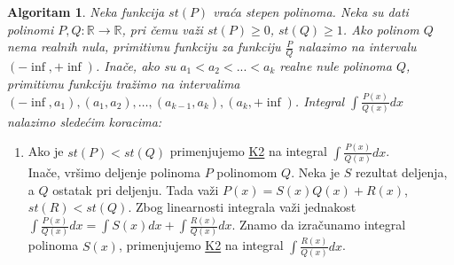 \documentclass{article}
\newtheorem{alg}{Algoritam}[section]
\begin{document}
\begin{algbox}
    \begin{alg}
        Neka funkcija $st(P)$ vraća stepen polinoma.
        Neka su dati polinomi $P, Q: \mathbb{R} \longrightarrow \mathbb{R}$, pri čemu
        važi $st(P)\geq0$, $st(Q)\geq1$. Ako polinom $Q$ nema realnih nula, primitivnu funkciju
        za funkciju $\frac{P}{Q}$ nalazimo na intervalu $(-\inf, +\inf)$. Inače,
        ako su $a_1 < a_2 < ... < a_k$ realne nule polinoma $Q$, primitivnu funkciju
        tražimo na intervalima $(-\inf, a_1),(a_1, a_2),\dotsc,(a_{k-1},a_k),(a_k,+\inf)$.
        Integral $\int \frac{P(x)}{Q(x)}dx$ nalazimo sledećim koracima:
    \end{alg}
    \begin{enumerate}[label=\text{K\arabic*}]
        \item\label{Algoritam_1_K1}
              Ako je $st(P) < st(Q)$ primenjujemo \hyperref[Algoritam_1_K2]{K2} na integral $\int \frac{P(x)}{Q(x)}dx$.\\
              Inače, vršimo deljenje polinoma $P$ polinomom $Q$.
              Neka je $S$ rezultat deljenja, a $Q$ ostatak pri deljenju.
              Tada važi $P(x) = S(x)Q(x) + R(x)$, $st(R)<st(Q)$.
              Zbog linearnosti integrala važi jednakost $\int\frac{P(x)}{Q(x)}dx = \int S(x)dx + \int\frac{R(x)}{Q(x)}dx$.
              Znamo da izračunamo integral polinoma $S(x)$, primenjujemo \hyperref[Algoritam_1_K2]{K2}
              na integral $\int \frac{R(x)}{Q(x)}dx$.


\end{enumerate}
\end{algbox}
\end{document}
